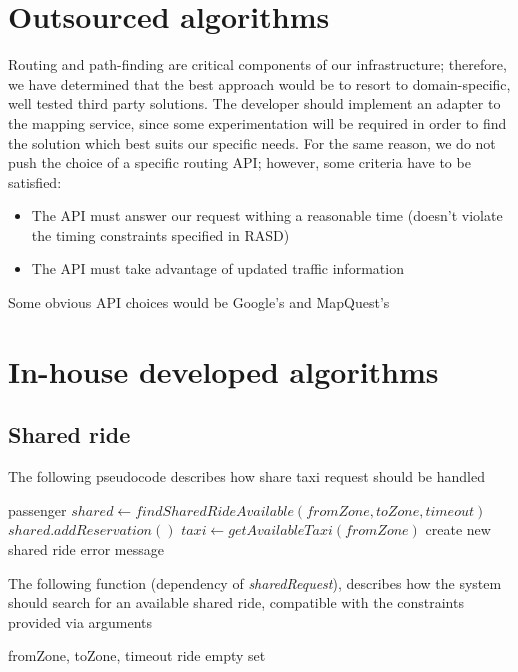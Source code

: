 \section{Outsourced algorithms}
Routing and path-finding are critical components of our infrastructure; therefore, we have determined
that the best approach would be to resort to domain-specific, well tested third party solutions.
The developer should implement an adapter to the mapping service, since some experimentation will
be required in order to find the solution which best suits our specific needs. For
the same reason, we do not push the choice of a specific routing API; however, some criteria
have to be satisfied:
\begin{itemize}
 \item The API must answer our request withing a reasonable time (doesn't violate the timing constraints specified in RASD)
 \item The API must take advantage of updated traffic information
\end{itemize}
Some obvious API choices would be Google's and MapQuest's


\section{In-house developed algorithms}

\subsection{Shared ride}
The following pseudocode describes how share taxi request should be handled
\begin{algorithmic}
  {passenger}
  \State $ shared \gets findSharedRideAvailable(fromZone, toZone, timeout) $
    \State $ shared.addReservation() $
  \Else
    \State $ taxi \gets getAvailableTaxi(fromZone) $
      \State create new shared ride
    \Else
      \State error message
    \EndIf
  \EndIf
 \EndFunction
\end{algorithmic}
\vspace{5mm}

The following function (dependency of \textit{sharedRequest}), describes how the system should search for an
available shared ride, compatible with the constraints provided via arguments
\begin{algorithmic}
  {fromZone, toZone, timeout}
	    \State \Return ride
	  \EndIf
	\EndIf
      \EndIf
    \EndIf
  \EndFor
  \State \Return empty set
 \EndFunction
\end{algorithmic}
\vspace{5mm}

